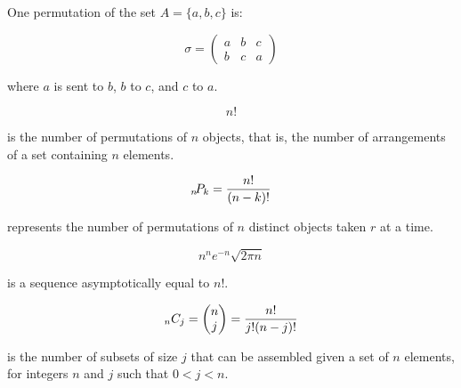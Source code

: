 One permutation of the set $A = \{a, b, c\}$ is:

\begin{equation}
    \sigma = \begin{pmatrix}
                  a & b & c \\ 
                  b & c & a
             \end{pmatrix}
\end{equation}

where $a$ is sent to $b$, $b$ to $c$, and $c$ to $a$.
\hformbar



\begin{equation}
    n!
\end{equation}

is the number of permutations of $n$ objects, that is, the number of arrangements of a set containing $n$ elements.
\hformbar




\begin{equation}
    {}_{n}\!P_{k}=\frac{n!}{(n-k)!}
\end{equation}

represents the number of permutations of $n$ distinct objects taken $r$ at a time.
\hformbar




\begin{equation}
    n^n e^{-n} \sqrt{2 \pi n}
\end{equation}

is a sequence asymptotically equal to $n!$.
\hformbar




\begin{equation}
    {}_{n}C_{j} = \begin{pmatrix} n \\ j \end{pmatrix} = \frac{n!}{j! (n - j)!}
\end{equation}

is the number of subsets of size $j$ that can be assembled given a set of $n$ elements, for integers $n$ and $j$ such that $0 < j < n$.
\hformbar




